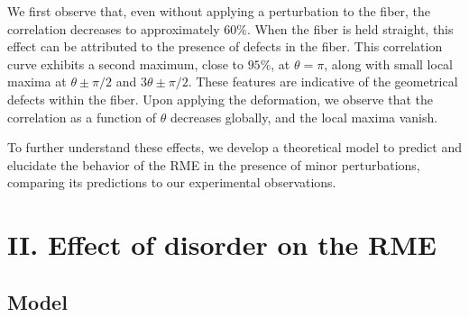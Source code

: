 \documentclass[aps,prl,twocolumn, amsmath,amssymb,superscriptaddress]{revtex4-2}
\newcommand{\red}[1]{\textcolor{red}{#1}}
\begin{document}
We first observe that, even without applying a perturbation to the fiber, 
the correlation decreases to approximately $60\%$. 
When the fiber is held straight, 
this effect can be attributed to the presence of defects in the fiber. 
This correlation curve exhibits a second maximum, close to $95\%$, at $\theta=\pi$, 
along with small local maxima at $\theta\pm\pi/2$ and $3\theta\pm\pi/2$. 
These features are indicative of the geometrical defects within the fiber.
Upon applying the deformation, 
we observe that the correlation as a function of $\theta$ decreases globally, 
and the local maxima vanish. 

To further understand these effects, 
we develop a theoretical model to predict and elucidate 
the behavior of the RME in the presence of minor perturbations, 
comparing its predictions to our experimental observations.


\section{II. Effect of disorder on the RME}

 \subsection*{Model}

\end{document}
